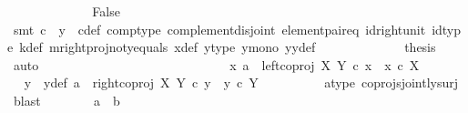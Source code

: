 \begin{isabellebody}
\ \ \ \ \ \ \ \ \ \ \isamarkupfalse%
\ \isamarkupfalse%
\ False\isanewline
\ \ \ \ \ \ \ \ \ \ \ \ \isamarkupfalse%
\ {\isacharparenleft}{\kern0pt}smt\ {\isacartoucheopen}c\ {\isasymnoteq}\ y{}{\isacartoucheclose}\ \ c{\isacharunderscore}{\kern0pt}def\ comp{\isacharunderscore}{\kern0pt}type\ complement{\isacharunderscore}{\kern0pt}disjoint\ element{\isacharunderscore}{\kern0pt}pair{\isacharunderscore}{\kern0pt}eq\ id{\isacharunderscore}{\kern0pt}right{\isacharunderscore}{\kern0pt}unit{}\ id{\isacharunderscore}{\kern0pt}type\ k{\isacharunderscore}{\kern0pt}def\ m{\isacharunderscore}{\kern0pt}rightproj{\isacharunderscore}{\kern0pt}not{\isacharunderscore}{\kern0pt}y{}{\isacharunderscore}{\kern0pt}equals\ x{\isacharunderscore}{\kern0pt}def\ y{}{\isacharprime}{\kern0pt}{\isacharunderscore}{\kern0pt}type\ y{}{\isacharunderscore}{\kern0pt}mono\ y{}y{}{\isacharunderscore}{\kern0pt}def{\isacharparenleft}{\kern0pt}{}{\isacharparenright}{\kern0pt}{\isacharparenright}{\kern0pt}\isanewline
\ \ \ \ \ \ \ \ \ \ \isamarkupfalse%
\ \isamarkupfalse%
\ {\isacharquery}{\kern0pt}thesis\ \isamarkupfalse%
\ auto\isanewline
\ \ \ \ \ \ \ \ \isamarkupfalse%
\isanewline
\ \ \ \ \ \ \isamarkupfalse%
\isanewline
\ \ \ \ \isamarkupfalse%
\ \isanewline
\ \ \ \ \ \ \isamarkupfalse%
\ {\isachardoublequoteopen}{\isasymnexists}x{\isachardot}{\kern0pt}\ a\ {\isacharequal}{\kern0pt}\ left{\isacharunderscore}{\kern0pt}coproj\ X\ Y\ {\isasymcirc}\isactrlsub c\ x\ {\isasymand}\ x\ {\isasymin}\isactrlsub c\ X{\isachardoublequoteclose}\isanewline
\ \ \ \ \ \ \isamarkupfalse%
\ \isamarkupfalse%
\ y\ \ y{\isacharunderscore}{\kern0pt}def{\isacharcolon}{\kern0pt}\ {\isachardoublequoteopen}a\ {\isacharequal}{\kern0pt}\ right{\isacharunderscore}{\kern0pt}coproj\ X\ Y\ {\isasymcirc}\isactrlsub c\ y\ {\isasymand}\ y\ {\isasymin}\isactrlsub c\ Y{\isachardoublequoteclose}\isanewline
\ \ \ \ \ \ \ \ \isamarkupfalse%
\ a{\isacharunderscore}{\kern0pt}type\ coprojs{\isacharunderscore}{\kern0pt}jointly{\isacharunderscore}{\kern0pt}surj\ \isamarkupfalse%
\ blast\isanewline
\isanewline
\ \ \ \ \ \ \isamarkupfalse%
\ {\isachardoublequoteopen}a\ {\isacharequal}{\kern0pt}\ b{\isachardoublequoteclose}\isanewline
\ \ \ \ \ \ \isamarkupfalse%

\end{isabellebody}
